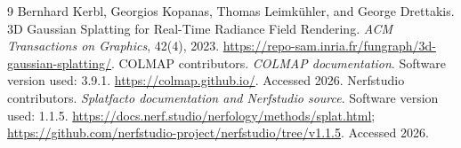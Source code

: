 \documentclass{article}
\begin{document}
\begin{thebibliography}{9}
Bernhard Kerbl, Georgios Kopanas, Thomas Leimk\"uhler, and George Drettakis.
3D Gaussian Splatting for Real-Time Radiance Field Rendering.
\emph{ACM Transactions on Graphics}, 42(4), 2023.
\url{https://repo-sam.inria.fr/fungraph/3d-gaussian-splatting/}.
COLMAP contributors. \emph{COLMAP documentation}. Software version used: 3.9.1.
\url{https://colmap.github.io/}. Accessed 2026.
Nerfstudio contributors. \emph{Splatfacto documentation and Nerfstudio source}.
Software version used: 1.1.5.
\url{https://docs.nerf.studio/nerfology/methods/splat.html};
\url{https://github.com/nerfstudio-project/nerfstudio/tree/v1.1.5}. Accessed 2026.
\end{thebibliography}
\end{document}

